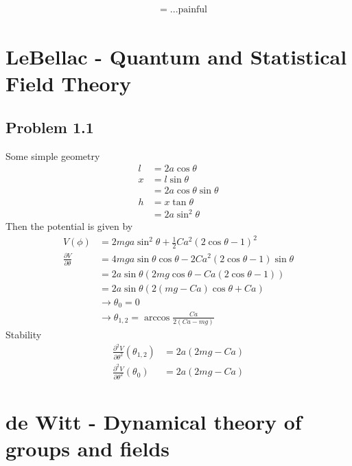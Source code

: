 \documentclass[../main.tex]{subfiles}
\begin{document}
\begin{align}
[M_{\mu\nu},M_{\rho,\sigma}]
&=...\text{painful}
\end{align}

\section{{\sc LeBellac} - Quantum and Statistical Field Theory}
\subsection{Problem 1.1}
Some simple geometry
\begin{align}
l&=2a\cos\theta\\
x&=l\sin\theta\\
&=2a\cos\theta\sin\theta\\
h&=x\tan\theta\\
&=2a\sin^2\theta
\end{align}
Then the potential is given by
\begin{align}
V(\phi)
&=2mga\sin^2\theta+\frac{1}{2}Ca^2(2\cos\theta-1)^2\\
\frac{\partial V}{\partial\theta}
&=4mga\sin\theta\cos\theta-2Ca^2(2\cos\theta-1)\sin\theta\\
&=2a\sin\theta\left(2mg\cos\theta-Ca(2\cos\theta-1)\right)\\
&=2a\sin\theta\left(2(mg-Ca)\cos\theta+Ca\right)\\
&\rightarrow\theta_0=0\\
&\rightarrow\theta_{1,2}=\arccos\frac{Ca}{2(Ca-mg)}
\end{align}
Stability
\begin{align}
\frac{\partial^2 V}{\partial\theta^2}(\theta_{1,2})
&=2a(2mg-Ca)\\
\frac{\partial^2 V}{\partial\theta^2}(\theta_{0})
&=2a(2mg-Ca)
\end{align}




\section{{\sc de Witt} - Dynamical theory of groups and fields}
\end{document}
